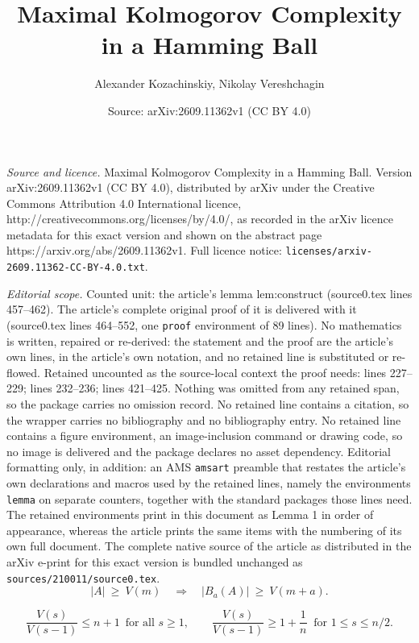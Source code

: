 \documentclass[10pt,a4paper]{amsart}
\title{Maximal Kolmogorov Complexity in a Hamming Ball}
\author{Alexander Kozachinskiy, Nikolay Vereshchagin}
\date{Source: arXiv:2609.11362v1 (CC BY 4.0)}
\renewcommand{\ge}{\geqslant}
\renewcommand{\le}{\leqslant}
\begin{document}
\maketitle

\noindent\emph{Source and licence.} Maximal Kolmogorov Complexity in a Hamming Ball. Version arXiv:2609.11362v1 (CC BY 4.0), distributed by arXiv under the Creative Commons Attribution 4.0 International licence, http://creativecommons.org/licenses/by/4.0/, as recorded in the arXiv licence metadata for this exact version and shown on the abstract page https://arxiv.org/abs/2609.11362v1. Full licence notice: \texttt{licenses/arxiv-2609.11362-CC-BY-4.0.txt}.\par\smallskip

\noindent\textit{Editorial scope.} Counted unit: the article's lemma lem:construct (source0.tex lines 457--462). The article's complete original proof of it is delivered with it (source0.tex lines 464--552, one \texttt{proof} environment of 89 lines). No mathematics is written, repaired or re-derived: the statement and the proof are the article's own lines, in the article's own notation, and no retained line is substituted or re-flowed.  Retained uncounted as the source-local context the proof needs: lines 227--229; lines 232--236; lines 421--425.  Nothing was omitted from any retained span, so the package carries no omission record.  No retained line contains a citation, so the wrapper carries no bibliography and no bibliography entry.  No retained line contains a figure environment, an image-inclusion command or drawing code, so no image is delivered and the package declares no asset dependency.  Editorial formatting only, in addition: an AMS \texttt{amsart} preamble that restates the article's own declarations and macros used by the retained lines, namely the environments \texttt{lemma} on separate counters, together with the standard packages those lines need.  The retained environments print in this document as Lemma 1 in order of appearance, whereas the article prints the same items with the numbering of its own full document.  The complete native source of the article as distributed in the arXiv e-print for this exact version is bundled unchanged as \texttt{sources/210011/source0.tex}.
\begin{equation}\label{eq:harper}
  |A|\ \ge\ V(m)\quad\Longrightarrow\quad |B_a(A)|\ \ge\ V(m+a).
\end{equation}

\begin{equation}\label{eq:ratio}
  \frac{V(s)}{V(s-1)}\le n+1\, \text{ for all }s\ge1,
  \qquad
  \frac{V(s)}{V(s-1)}\ge1+\frac1n\ \text{ for }1\le s\le n/2 .
\end{equation}
\end{document}
